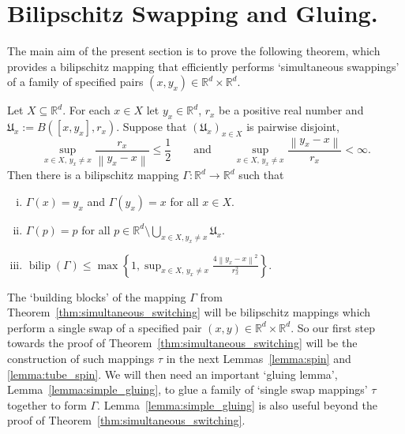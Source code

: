 \documentclass[a4paper, bibliography=totoc]{scrartcl}
\numberwithin{claimcounter}{define}
\newcommand{\R}{\mathbb{R}}
\newcommand{\bilip}{\operatorname{bilip}}
\newcommand{\enorm}[1]{\left\|#1\right\|}
\newcommand{\mf}[1]{\mathfrak{#1}}
\newcommand{\set}[1]{\left\{#1\right\}}
\begin{document}
\section{Bilipschitz Swapping and Gluing.}\label{section:swapping}\label{sec:proto}
The main aim of the present section is to prove the following theorem, which provides a bilipschitz mapping that efficiently performs `simultaneous swappings' of a family of specified pairs $(x,y_{x})\in\R^{d}\times \R^{d}$.
\begin{thm}\label{thm:simultaneous_switching}
	Let $X\subseteq \R^{d}$. For each $x\in X$ let $y_{x}\in\R^{d}$, $r_{x}$ be a positive real number and $\mf{U}_{x}:=B([x,y_{x}],r_{x})$.  Suppose that $(\mf{U}_{x})_{x\in X}$ is pairwise disjoint, 
	\begin{equation*}
	\sup_{x\in X,\, y_{x}\neq x}\frac{r_{x}}{\enorm{y_{x}-x}}\leq \frac{1}{2}\qquad\text{and}\qquad\sup_{x\in X,\, y_{x}\neq x}\frac{\enorm{y_{x}-x}}{r_{x}}<\infty.
	\end{equation*}
	Then there is a bilipschitz mapping $\Gamma\colon \R^{d}\to \R^{d}$ such that
	\begin{enumerate}[(i)]
		\item $\Gamma(x)=y_{x}$ and $\Gamma(y_{x})=x$ for all $x\in X$.
		\item $\Gamma(p)=p$ for all $\displaystyle p\in \R^{d}\setminus \bigcup_{x\in X, y_{x}\neq x}\mf{U}_{x}$.
		\item $\displaystyle \bilip(\Gamma)\leq \max\set{1, \sup_{x\in X,\, y_{x}\neq x}\frac{4\enorm{y_{x}-x}^{2}}{r_{x}^{2}}}$.
	\end{enumerate}
\end{thm}
The `building blocks' of the mapping $\Gamma$ from Theorem~\ref{thm:simultaneous_switching} will be bilipschitz mappings which perform a single swap of a specified pair $(x,y)\in\R^{d}\times \R^{d}$. So our first step towards the proof of Theorem~\ref{thm:simultaneous_switching} will be the construction of such mappings $\tau$ in the next Lemmas~\ref{lemma:spin} and \ref{lemma:tube_spin}. We will then need an important `gluing lemma', Lemma~\ref{lemma:simple_gluing}, to glue a family of `single swap mappings' $\tau$ together to form $\Gamma$. Lemma~\ref{lemma:simple_gluing} is also useful beyond the proof of Theorem~\ref{thm:simultaneous_switching}.
\end{document}

